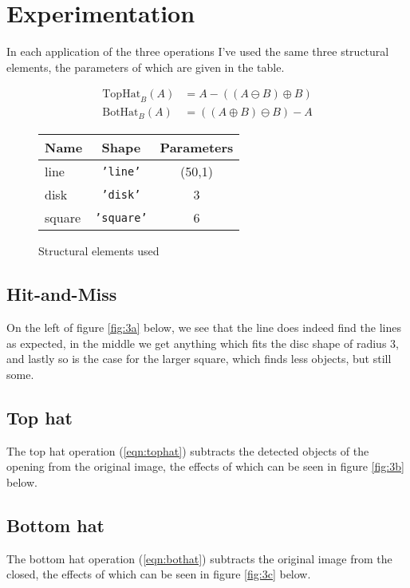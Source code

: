 %
%

\section{Experimentation}
\begin{multicols}{2}
    \noindent
    In each application of the three operations I've used the same three
    structural elements, the parameters of which are given in the table.
    
    \begin{align}
        \text{TopHat}_B(A) &= A - ((A \ominus B) \oplus B) \label{eqn:tophat} \\
        \text{BotHat}_B(A) &= ((A \oplus B) \ominus B) - A \label{eqn:bothat}
    \end{align}
    
    \vfill\columnbreak

    \begin{figure}[H]
        \center
        \begin{tabular}{|l|c|c|}
            \hline {\bf Name} & {\bf Shape} & {\bf Parameters} \\ \hline
            line & {\tt 'line'} & (50,1) \\ \hline
            disk & {\tt 'disk'} & 3 \\ \hline
            square & {\tt 'square'} & 6 \\ \hline
        \end{tabular}
        \caption{Structural elements used}
        \label{fig:experimental-se}
    \end{figure}
\end{multicols}

\newpage
\subsection{Hit-and-Miss}
On the left of figure \ref{fig:3a} below, we see that the line does indeed
find the lines as expected, in the middle we get anything which fits the disc
shape of radius 3, and lastly so is the case for the larger square, which
finds less objects, but still some.


\subsection{Top hat}
The top hat operation (\ref{eqn:tophat}) subtracts the detected objects of the
opening from the original image, the effects of which can be seen in figure
\ref{fig:3b} below.

\subsection{Bottom hat}
The bottom hat operation (\ref{eqn:bothat}) subtracts the original image from
the closed, the effects of which can be seen in figure \ref{fig:3c} below.

